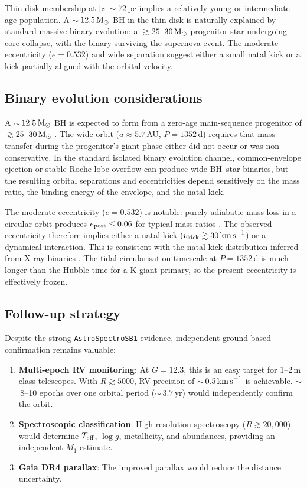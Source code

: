 \documentclass[usenatbib,fleqn]{mnras}
\newcommand{\Msun}{{\rm M}_\odot}
\newcommand{\kms}{{\rm km\,s}^{-1}}
\begin{document}
Thin-disk membership at $|z| \sim 72$\,pc implies a relatively
young or intermediate-age population.  A $\sim$\,$12.5\,\Msun$ BH
in the thin disk is naturally explained by standard massive-binary
evolution: a $\gtrsim 25$--$30\,\Msun$ progenitor star undergoing
core collapse, with the binary surviving the supernova event.
The moderate eccentricity ($e = 0.532$) and wide separation suggest
either a small natal kick or a kick partially aligned with the
orbital velocity.

\subsection{Binary evolution considerations}
\label{sec:discussion:binary_evolution}

A $\sim$\,$12.5\,\Msun$ BH is expected to form from a zero-age
main-sequence progenitor of $\gtrsim 25$--$30\,\Msun$
\citep{Fryer2012, Belczynski2020}.  The wide orbit
($a \approx 5.7\,$AU, $P = 1352\,$d) requires that mass transfer
during the progenitor's giant phase either did not occur or was
non-conservative.  In the standard isolated binary evolution
channel, common-envelope ejection or stable Roche-lobe overflow
can produce wide BH--star binaries, but the resulting orbital
separations and eccentricities depend sensitively on the mass
ratio, the binding energy of the envelope, and the natal kick.

The moderate eccentricity ($e = 0.532$) is notable: purely
adiabatic mass loss in a circular orbit produces $e_{\rm post}
\leq 0.06$ for typical mass ratios \citep{Blaauw1961}.  The
observed eccentricity therefore implies either a natal kick
($v_{\rm kick} \gtrsim 30\,\kms$) or a dynamical interaction.
This is consistent with the natal-kick distribution inferred
from X-ray binaries \citep{Repetto2012}.
The tidal circularisation timescale at $P = 1352\,$d is much
longer than the Hubble time for a K-giant primary, so the
present eccentricity is effectively frozen.

\subsection{Follow-up strategy}
\label{sec:followup}

Despite the strong \texttt{AstroSpectroSB1} evidence, independent
ground-based confirmation remains valuable:
\begin{enumerate}
\item \textbf{Multi-epoch RV monitoring}: At $G = 12.3$, this is
  an easy target for 1--2\,m class telescopes.  With
  $R \gtrsim 5000$, RV precision of $\sim$\,$0.5\,\kms$ is
  achievable.  $\sim$\,8--10 epochs over one orbital period
  ($\sim$\,$3.7$\,yr) would independently confirm the orbit.
\item \textbf{Spectroscopic classification}: High-resolution
  spectroscopy ($R \gtrsim 20{,}000$) would determine
  $T_{\rm eff}$, $\log g$, metallicity, and abundances, providing
  an independent $M_1$ estimate.
\item \textbf{Gaia DR4 parallax}: The improved parallax would
  reduce the distance uncertainty.
\end{enumerate}
\end{document}
